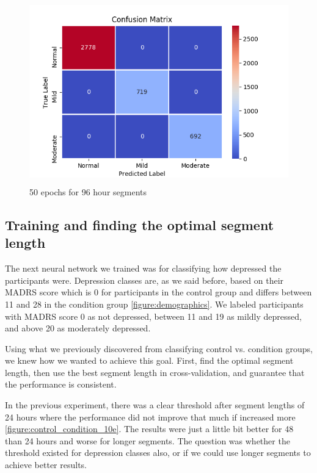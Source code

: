 \begin{figure}[h]
\begin{center}
      \includegraphics[height=8cm]{img/depression_class/conf_5760_60_50_32.png}
      \caption{50 epochs for 96 hour segments}
      \label{figure:depression_class_confusion_matrix_96h}
\end{center}
\end{figure}

\subsection{Training and finding the optimal segment length}

The next neural network we trained was for classifying how depressed the participants were. Depression classes are, as we said before, 
based on their MADRS score which is 0 for participants in the control group and differs between 11 and 28 in the condition group \ref{figure:demographics}. We labeled participants with MADRS score 0 as not depressed, between 11 and 19 as mildly depressed, and above 20 as moderately depressed. 

Using what we previously discovered from classifying control vs. condition groups, we knew how we wanted to achieve this goal. First, find the optimal segment length, then use the best segment length in cross-validation, and guarantee that the performance is consistent. 

In the previous experiment, there was a clear threshold after segment lengths of 24 hours where the performance did not improve that much if increased more \ref{figure:control_condition_10e}. The results were just a little bit better for 48 than 24 hours and worse for longer segments. The question was whether the threshold existed for depression classes also, or if we could use longer segments to achieve better results.

